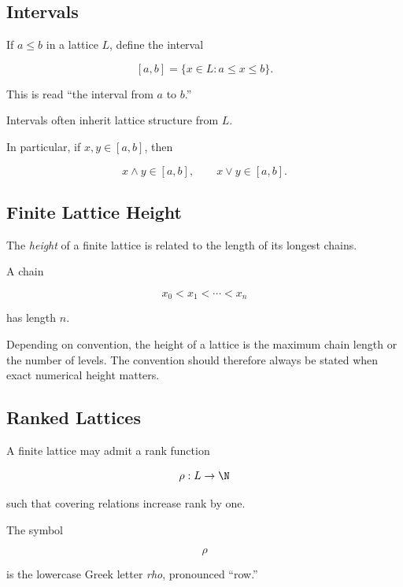 \subsection{Intervals}
\label{subsec:lattice-intervals}

If \(a\leq b\) in a lattice \(L\), define the interval

\[ [a,b]=\{x\in L:a\leq x\leq b\}. \]

This is read ``the interval from \(a\) to \(b\).''

Intervals often inherit lattice structure from \(L\).

In particular, if \(x,y\in[a,b]\), then

\[ x\wedge y\in[a,b],\qquad x\vee y\in[a,b]. \]

\subsection{Finite Lattice Height}
\label{subsec:lattice-height}

The \emph{height} of a finite lattice is related to the length of its longest
chains.

A chain

\[ x_0<x_1<\cdots<x_n \]

has length \(n\).

Depending on convention, the height of a lattice is the maximum chain length
or the number of levels. The convention should therefore always be stated
when exact numerical height matters.

\subsection{Ranked Lattices}
\label{subsec:ranked-lattices}

A finite lattice may admit a rank function

\[ \rho:L\to\N \]

such that covering relations increase rank by one.

The symbol

\[ \rho \]

is the lowercase Greek letter \emph{rho}, pronounced ``row.''

